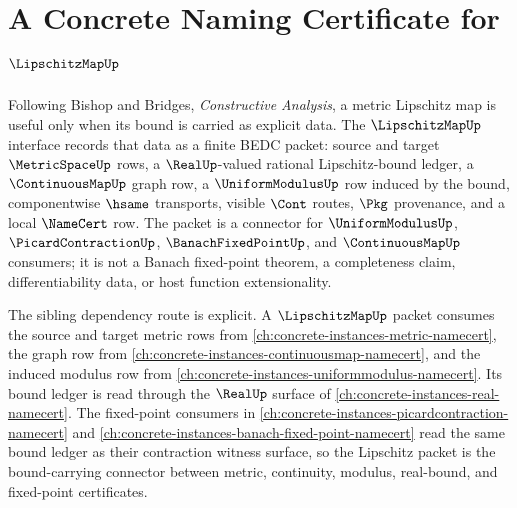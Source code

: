 \chapter{A Concrete Naming Certificate for $\LipschitzMapUp$}
\label{ch:concrete-instances-lipschitzmap-namecert}

Following Bishop and Bridges, \emph{Constructive Analysis}, a metric
Lipschitz map is useful only when its bound is carried as explicit data. The
$\LipschitzMapUp$ interface records that data as a finite BEDC packet: source
and target $\MetricSpaceUp$ rows, a $\RealUp$-valued rational Lipschitz-bound
ledger, a $\ContinuousMapUp$ graph row, a $\UniformModulusUp$ row induced by the
bound, componentwise $\hsame$ transports, visible $\Cont$ routes, $\Pkg$
provenance, and a local $\NameCert$ row. The packet is a connector for
$\UniformModulusUp$, $\PicardContractionUp$, $\BanachFixedPointUp$, and
$\ContinuousMapUp$ consumers; it is not a Banach fixed-point theorem, a
completeness claim, differentiability data, or host function extensionality.

The sibling dependency route is explicit. A $\LipschitzMapUp$ packet consumes
the source and target metric rows from \autoref{ch:concrete-instances-metric-namecert},
the graph row from \autoref{ch:concrete-instances-continuousmap-namecert}, and
the induced modulus row from \autoref{ch:concrete-instances-uniformmodulus-namecert}.
Its bound ledger is read through the $\RealUp$ surface of
\autoref{ch:concrete-instances-real-namecert}. The fixed-point consumers in
\autoref{ch:concrete-instances-picardcontraction-namecert} and
\autoref{ch:concrete-instances-banach-fixed-point-namecert} read the same bound
ledger as their contraction witness surface, so the Lipschitz packet is the
bound-carrying connector between metric, continuity, modulus, real-bound, and
fixed-point certificates.

